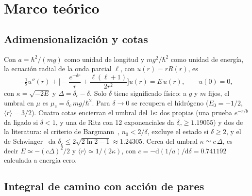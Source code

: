 \documentclass[10pt,letterpaper]{article}
\newcommand{\dc}{\delta_c}
\newcommand{\mr}{\langle r\rangle}
\newcommand{\dd}{\mathrm{d}}
\newcommand{\hb}{\hbar}
\begin{document}
\section{Marco teórico}
\subsection{Adimensionalización y cotas}

Con $a=\hb^2/(mg)$ como unidad de longitud y $mg^2/\hb^2$ como unidad de energía, la ecuación radial de la onda parcial $\ell$, con $u(r)=rR(r)$, es
\begin{equation}
-\tfrac12u''(r)+\Big[-\frac{e^{-\delta r}}{r}+\frac{\ell(\ell+1)}{2r^2}\Big]u(r)=E\,u(r),\qquad u(0)=0,\label{eq:radial}
\end{equation}
con $\kappa=\sqrt{-2E}$ y $\Delta=\dc-\delta$. Solo $\delta$ tiene significado físico: a $g$ y $m$ fijos, el umbral en $\mu$ es $\mu_c=\dc\,mg/\hb^2$. Para $\delta\to0$ se recupera el hidrógeno ($E_0=-1/2$, $\mr=3/2$). Cuatro cotas encierran el umbral del 1s: dos propias (una prueba $e^{-r/b}$ da ligado si $\delta<1$, y una de Ritz con 12 exponenciales da $\dc\ge1.19055$) y dos de la literatura: el criterio de Bargmann~\cite{Bargmann1952}, $n_0<2/\delta$, excluye el estado si $\delta\ge2$, y el de Schwinger~\cite{Schwinger1961} da $\dc\le2\sqrt{2\ln2-1}\approx1.24305$. Cerca del umbral $\kappa\simeq c\,\Delta$, es decir $E\simeq-(c\Delta)^2/2$ y $\mr\simeq1/(2\kappa)$, con $c=-\dd(1/a)/\dd\delta=0.741192$ calculada a energía cero.

\subsection{Integral de camino con acción de pares}
\end{document}
